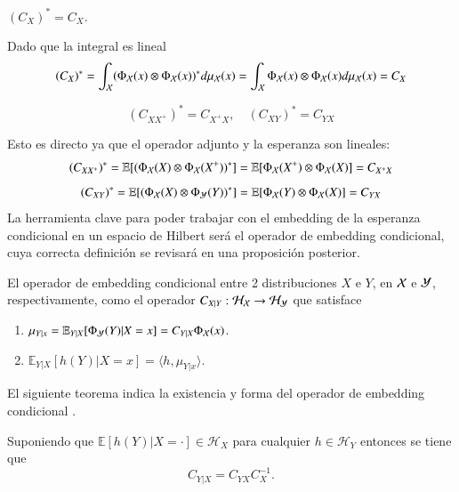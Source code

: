 	\begin{cor} $(C_{X})^* = C_X$.
	\end{cor}
	Dado que la integral es lineal
	\begin{equation*}
		(C_X)^* = \int_{\mathcal{X}} (\Phi_{\mathcal{X}} (x) \otimes \Phi_{\mathcal{X}} (x))^* d \mu_{\mathcal{X}} (x) = \int_{\mathcal{X}} \Phi_{\mathcal{X}} (x) \otimes \Phi_{\mathcal{X}} (x) d \mu_{\mathcal{X}} (x) = C_X
	\end{equation*}
	\begin{cor}
		\begin{equation*}
			(C_{XX^+})^* = C_{X^+X}, \quad (C_{XY})^* = C_{YX}
		\end{equation*}
	\end{cor}
	Esto es directo ya que el operador adjunto y la esperanza son lineales:
	\begin{equation*}
		(C_{X X^+})^* = \mathbb{E} [(\Phi_{\mathcal{X}} (X) \otimes \Phi_{\mathcal{X}} (X^+))^*] = \mathbb{E} [\Phi_{\mathcal{X}} (X^+) \otimes \Phi_{\mathcal{X}} (X)] = C_{X^+X} 
	\end{equation*}
	\begin{equation*}
		(C_{X Y})^* = \mathbb{E} [(\Phi_{\mathcal{X}} (X) \otimes \Phi_{\mathcal{Y}} (Y))^*] = \mathbb{E} [\Phi_{\mathcal{X}} (Y) \otimes \Phi_{\mathcal{X}} (X)] = C_{YX} 
	\end{equation*}
La herramienta clave para poder trabajar con el embedding de la esperanza condicional en un espacio de Hilbert será el operador de embedding condicional, cuya correcta definición se revisará en una proposición posterior.
\begin{defn}
    El operador de embedding condicional entre 2 distribuciones $X$ e $Y$, en $\mathcal{X}$ e $\mathcal{Y}$, respectivamente, como el operador $C_{X|Y} : \mathcal{H}_{\mathcal{X}} \to \mathcal{H}_{\mathcal{Y}}$ que satisface
    \begin{enumerate}
        \item $\mu_{Y|x} = \mathbb{E}_{Y|X}[\Phi_{\mathcal{Y}} (Y)|X=x] = C_{Y|X}\Phi_{\mathcal{X}} (x)$.
        \item $\mathbb{E}_{Y|X}[h(Y)|X=x] = \langle h, \mu_{Y|x} \rangle$.
    \end{enumerate}
\end{defn}
El siguiente teorema indica la existencia y forma del operador de embedding condicional \cite{Fukumizu2004DimensionalitySpaces, Song2009HilbertSystems}.
\begin{teo}
    Suponiendo que \( \mathbb{E}[h(Y)|X = \cdot] \in \mathcal{H}_X \) para cualquier \( h \in \mathcal{H}_Y \) entonces se tiene que
    \[ C_{Y|X} = C_{YX} C_{X}^{-1}.\]
\end{teo}

